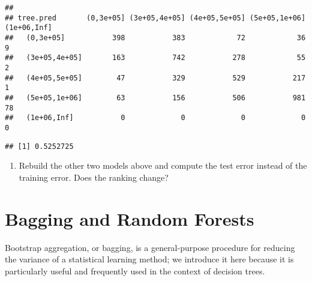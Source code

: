 \documentclass[
]{article}
\newenvironment{Shaded}{\begin{snugshade}}{\end{snugshade}}
\newcommand{\AttributeTok}[1]{\textcolor[rgb]{0.77,0.63,0.00}{#1}}
\newcommand{\FunctionTok}[1]{\textcolor[rgb]{0.00,0.00,0.00}{#1}}
\newcommand{\NormalTok}[1]{#1}
\newcommand{\OtherTok}[1]{\textcolor[rgb]{0.56,0.35,0.01}{#1}}
\newcommand{\SpecialCharTok}[1]{\textcolor[rgb]{0.00,0.00,0.00}{#1}}
\newcommand{\StringTok}[1]{\textcolor[rgb]{0.31,0.60,0.02}{#1}}
\providecommand{\tightlist}{%
  \setlength{\itemsep}{0pt}\setlength{\parskip}{0pt}}
\begin{document}
\begin{Shaded}
\end{Shaded}

\begin{verbatim}
##                
## tree.pred       (0,3e+05] (3e+05,4e+05] (4e+05,5e+05] (5e+05,1e+06] (1e+06,Inf]
##   (0,3e+05]           398           383            72            36           9
##   (3e+05,4e+05]       163           742           278            55           2
##   (4e+05,5e+05]        47           329           529           217           1
##   (5e+05,1e+06]        63           156           506           981          78
##   (1e+06,Inf]           0             0             0             0           0
\end{verbatim}

\begin{Shaded}
\end{Shaded}

\begin{verbatim}
## [1] 0.5252725
\end{verbatim}

\begin{enumerate}
\def\labelenumi{(\arabic{enumi})}
\setcounter{enumi}{4}
\tightlist
\item
  Rebuild the other two models above and compute the test error instead
  of the training error. Does the ranking change?
\end{enumerate}

\hypertarget{bagging-and-random-forests}{%
\section{Bagging and Random Forests}\label{bagging-and-random-forests}}

Bootstrap aggregation, or bagging, is a general-purpose procedure for
reducing the variance of a statistical learning method; we introduce it
here because it is particularly useful and frequently used in the
context of decision trees.
\end{document}
